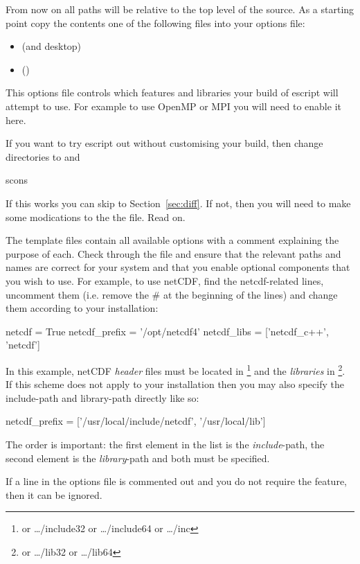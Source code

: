 From now on all paths will be relative to the top level of the source.
As a starting point copy the contents one of the following files into your options file:
\begin{itemize}
\item {} (\linux and \macosx desktop)
\item {} (\winxp)
\end{itemize}

This options file controls which features and libraries your build of escript will attempt to use.
For example to use OpenMP or MPI you will need to enable it here.

If you want to try escript out without customising your build, then change directories to  and
\begin{shellCode}
scons 
\end{shellCode}
If this works you can skip to Section~\ref{sec:diff}.
If not, then you will need to make some modications to the the file.
Read on.

The template files contain all available options with a comment explaining the
purpose of each.
Check through the file and ensure that the relevant paths and names are correct
for your system and that you enable optional components that you wish to use.
For example, to use netCDF, find the netcdf-related lines, uncomment them
(i.e. remove the \# at the beginning of the lines) and change them according
to your installation:
\begin{shellCode}
netcdf = True
netcdf_prefix = '/opt/netcdf4'
netcdf_libs = ['netcdf_c++', 'netcdf']
\end{shellCode}

In this example, netCDF \emph{header} files must be located in
\footnote{or \ldots/include32 or \ldots/include64 or \ldots/inc}
and the \emph{libraries} in \footnote{or \ldots/lib32 or \ldots/lib64}.
If this scheme does not apply to your installation then you may also specify
the include-path and library-path directly like so:
\begin{shellCode}
netcdf_prefix = ['/usr/local/include/netcdf', '/usr/local/lib']
\end{shellCode}
The order is important: the first element in the list is the
\emph{include}-path, the second element is the \emph{library}-path and both
must be specified.

If a line in the options file is commented out and you do not require the
feature, then it can be ignored.
 
